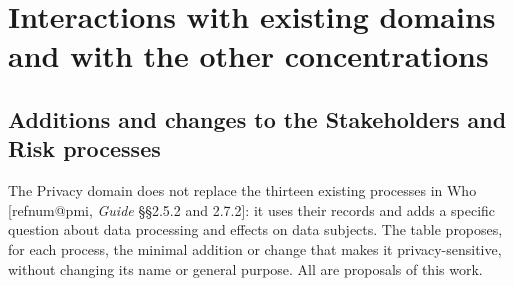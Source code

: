 \documentclass[11pt,a4paper]{article}
\makeatletter
\newcommand{\refnum}[1]{\csname refnum@#1\endcsname}
\makeatother
\begin{document}
\section{Interactions with existing domains and with the other concentrations}
\subsection{Additions and changes to the Stakeholders and Risk processes}

The Privacy domain does not replace the thirteen existing processes in Who [\refnum{pmi}, \textit{Guide} §§2.5.2 and 2.7.2]: it uses their records and adds a specific question about data processing and effects on data subjects. The table proposes, for each process, the minimal addition or change that makes it privacy-sensitive, without changing its name or general purpose. All are proposals of this work.
\end{document}

